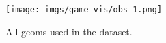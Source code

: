 \begin{figure}[h]
    \vskip 0.2in
    \begin{center}
        \centerline{\texttt{[image: imgs/game\_vis/obs\_1.png]}}
        \caption{All geoms used in the dataset.}
        \label{fig:geoms}
    \end{center}
    \vskip -0.2in
\end{figure}